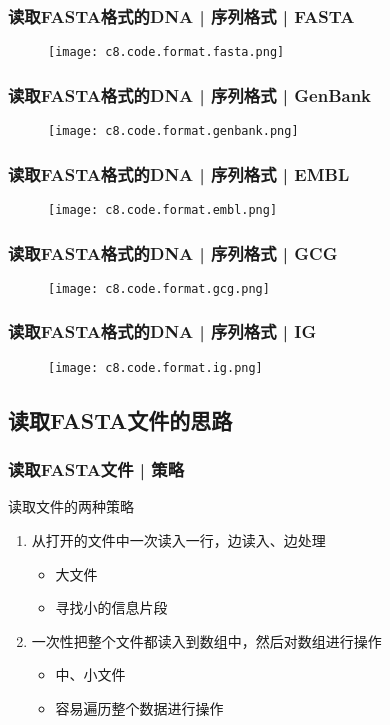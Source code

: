 \begin{frame}
  \frametitle{读取FASTA格式的DNA | 序列格式 | \alert{FASTA}}
  \begin{figure}
    \centering
    \texttt{[image: c8.code.format.fasta.png]}
  \end{figure}
\end{frame}

\begin{frame}
  \frametitle{读取FASTA格式的DNA | 序列格式 | \alert{GenBank}}
  \begin{figure}
    \centering
    \texttt{[image: c8.code.format.genbank.png]}
  \end{figure}
\end{frame}

\begin{frame}
  \frametitle{读取FASTA格式的DNA | 序列格式 | \alert{EMBL}}
  \begin{figure}
    \centering
    \texttt{[image: c8.code.format.embl.png]}
  \end{figure}
\end{frame}

\begin{frame}
  \frametitle{读取FASTA格式的DNA | 序列格式 | GCG}
  \begin{figure}
    \centering
    \texttt{[image: c8.code.format.gcg.png]}
  \end{figure}
\end{frame}

\begin{frame}
  \frametitle{读取FASTA格式的DNA | 序列格式 | IG}
  \begin{figure}
    \centering
    \texttt{[image: c8.code.format.ig.png]}
  \end{figure}
\end{frame}

\subsection{读取FASTA文件的思路}
\begin{frame}
  \frametitle{读取FASTA文件 | \alert{策略}}
  \begin{block}{读取文件的两种策略}
    \begin{enumerate}
      \item 从打开的文件中一次读入一行，边读入、边处理
	\begin{itemize}
	  \item 大文件
	  \item 寻找小的信息片段
	\end{itemize}
      \item 一次性把整个文件都读入到数组中，然后对数组进行操作
	\begin{itemize}
	  \item 中、小文件
	  \item 容易遍历整个数据进行操作
	\end{itemize}
    \end{enumerate}
  \end{block}
\end{frame}


